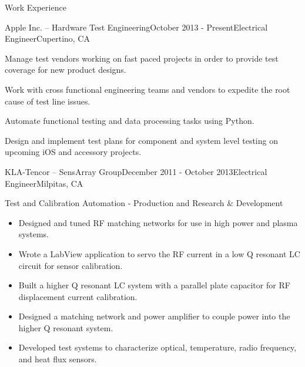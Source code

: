 \documentclass{resume} %
\begin{document}
\begin{rSection}{Work Experience}
\vspace{-0.5em}
\begin{rSubsection}{Apple Inc. -- Hardware Test Engineering}{October 2013 - Present}{Electrical Engineer}{Cupertino, CA}
\item Manage test vendors working on fast paced projects in order to provide test coverage for new product designs.
\item Work with cross functional engineering teams and vendors to expedite the root cause of test line issues.
\item Automate functional testing and data processing tasks using Python.
\item Design and implement test plans for component and system level testing on upcoming iOS and accessory projects.
\end{rSubsection}


\ssquish
\begin{rSubsection2}{KLA-Tencor -- SensArray Group}{December 2011 - October 2013}{Electrical Engineer}{Milpitas, CA}
\item Test and Calibration Automation - Production and Research \& Development
\begin{itemize}
\itemsep -0.5em \vspace{-0.5em}
\renewcommand{\labelitemi}{-}
\item Designed and tuned RF matching networks for use in high power and plasma systems.
\item Wrote a LabView application to servo the RF current in a low Q resonant LC circuit for sensor calibration.
\item Built a higher Q resonant LC system with a parallel plate capacitor for RF displacement current calibration.
\item Designed a matching network and power amplifier to couple power into the higher Q resonant system.
\item Developed test systems to characterize optical, temperature, radio frequency, and heat flux sensors.
\end{itemize}


\end{rSubsection2}
\end{rSection}
\end{document}
